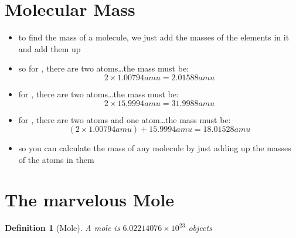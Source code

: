 \documentclass[11pt, oneside]{article}   	%
\newtheorem{definition}{Definition}
\begin{document}
\begin{itemize}
\begin{enumerate}[label=Example \arabic*]
\end{enumerate}
\end{itemize}

\section{Molecular Mass}
\begin{itemize}
\item to find the mass of a molecule, we just add the masses of the elements in it and add them up
\item so for , there are two  atoms\ldots the mass must be:\\
$$ 2 \times 1.00794 amu = 2.01588 amu$$
\item for , there are two  atoms\ldots the mass must be:\\
 $$ 2 \times 15.9994 amu = 31.9988 amu $$
\item for , there are two   atoms and one  atom\ldots the mass must be: \\
$$ ( 2 \times 1.00794 amu ) + 15.9994 amu = 18.01528 amu$$
\item so you can calculate the mass of any molecule by just adding up the masses of the atoms in them
\end{itemize}

\section{The marvelous Mole}

\begin{definition}[Mole]\label{defn:mole}
A mole is $6.02214076 \times 10^{23}$  objects
\end{definition}
\end{document}
